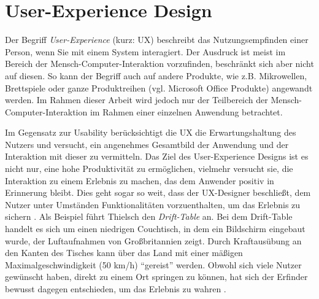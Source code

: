 \section{User-Experience Design} \label{sec:uxd}
Der Begriff \textit{User-Experience} (kurz: UX) beschreibt das Nutzungsempfinden einer Person, wenn Sie mit einem System interagiert. Der Ausdruck ist meist im Bereich der Mensch-Computer-Interaktion vorzufinden, beschränkt sich aber nicht auf diesen. \cite{Gube2010} So kann der Begriff auch auf andere Produkte, wie z.B. Mikrowellen, Brettspiele oder ganze Produktreihen (vgl. Microsoft Office Produkte) angewandt werden. Im Rahmen dieser Arbeit wird jedoch nur der Teilbereich der Mensch-Computer-Interaktion im Rahmen einer einzelnen Anwendung betrachtet. \par
Im Gegensatz zur Usability berücksichtigt die UX die Erwartungshaltung des Nutzers und versucht, ein angenehmes Gesamtbild der Anwendung und der Interaktion mit dieser zu vermitteln. Das Ziel des User-Experience Designs ist es nicht nur, eine hohe Produktivität zu ermöglichen, vielmehr versucht sie, die Interaktion zu einem Erlebnis zu machen, das dem Anwender positiv in Erinnerung bleibt. Dies geht sogar so weit, dass der UX-Designer beschließt, dem Nutzer unter Umständen Funktionalitäten vorzuenthalten, um das Erlebnis zu sichern \cite{Thielsch2015}. Als Beispiel führt Thielsch den \textit{Drift-Table} an. Bei dem Drift-Table handelt es sich um einen niedrigen Couchtisch, in dem ein Bildschirm eingebaut wurde, der Luftaufnahmen von Großbritannien zeigt. Durch Kraftausübung an den Kanten des Tisches kann über das Land mit einer mäßigen Maximalgeschwindigkeit (50 km/h) \enquote{gereist} werden. Obwohl sich viele Nutzer gewünscht haben, direkt zu einem Ort springen zu können, hat sich der Erfinder bewusst dagegen entschieden, um das Erlebnis zu wahren \cite{Thielsch2015}. \par

